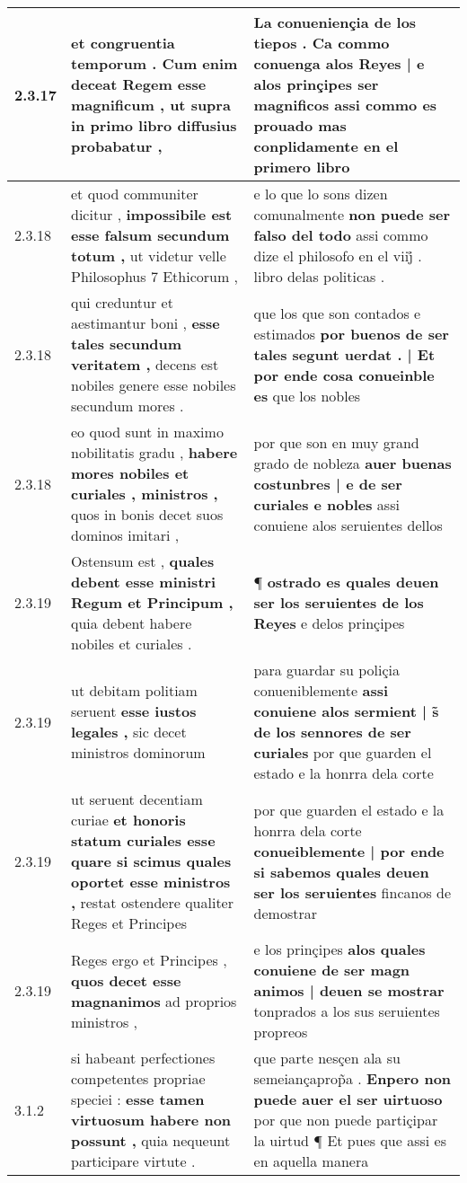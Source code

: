 \begin{tabular}{|p{1cm}|p{6.5cm}|p{6.5cm}|}
2.3.17 & et congruentia temporum . \textbf{ Cum enim deceat Regem esse magnificum , } ut supra in primo libro diffusius probabatur , & La conueniençia de los tiepos . \textbf{ Ca commo conuenga alos Reyes | e alos prinçipes ser magnificos } assi commo es prouado mas conplidamente en el primero libro \\\hline
2.3.18 & et quod communiter dicitur , \textbf{ impossibile est esse falsum secundum totum , } ut videtur velle Philosophus 7 Ethicorum , & e lo que lo sons dizen comunalmente \textbf{ non puede ser falso del todo } assi commo dize el philosofo en el viij̊ . libro delas politicas . \\\hline
2.3.18 & qui creduntur et aestimantur boni , \textbf{ esse tales secundum veritatem , } decens est nobiles genere esse nobiles secundum mores . & que los que son contados e estimados \textbf{ por buenos de ser tales segunt uerdat . | Et por ende cosa conueinble es } que los nobles \\\hline
2.3.18 & eo quod sunt in maximo nobilitatis gradu , \textbf{ habere mores nobiles et curiales , ministros , } quos in bonis decet suos dominos imitari , & por que son en muy grand grado de nobleza \textbf{ auer buenas costunbres | e de ser curiales e nobles } assi conuiene alos seruientes dellos \\\hline
2.3.19 & Ostensum est , \textbf{ quales debent esse ministri Regum et Principum , } quia debent habere nobiles et curiales . & ¶ \textbf{ ostrado es quales deuen ser los seruientes de los Reyes } e delos prinçipes \\\hline
2.3.19 & ut debitam politiam seruent \textbf{ esse iustos legales , } sic decet ministros dominorum & para guardar su poliçia conueniblemente \textbf{ assi conuiene alos sermient | s̃ de los sennores de ser curiales } por que guarden el estado e la honrra dela corte \\\hline
2.3.19 & ut seruent decentiam curiae \textbf{ et honoris statum curiales esse quare si scimus quales oportet esse ministros , } restat ostendere qualiter Reges et Principes & por que guarden el estado e la honrra dela corte \textbf{ conueiblemente | por ende si sabemos quales deuen ser los seruientes } fincanos de demostrar \\\hline
2.3.19 & Reges ergo et Principes , \textbf{ quos decet esse magnanimos } ad proprios ministros , & e los prinçipes \textbf{ alos quales conuiene de ser magn animos | deuen se mostrar } tonprados a los sus seruientes propreos \\\hline
3.1.2 & si habeant perfectiones competentes propriae speciei : \textbf{ esse tamen virtuosum habere non possunt , } quia nequeunt participare virtute . & que parte nesçen ala su semeiançaprop̃a . \textbf{ Enpero non puede auer el ser uirtuoso } por que non puede partiçipar la uirtud ¶ Et pues que assi es en aquella manera \\\hline

\end{tabular}

